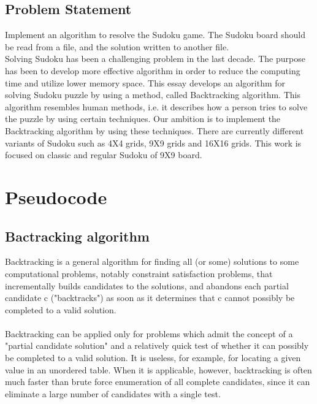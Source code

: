 \documentclass[12pt, letterpaper]{article}
\begin{document}
        \subsection{Problem Statement}
        Implement an algorithm to resolve the Sudoku game. The Sudoku board should be read from a file, and the solution written to another file. \\
        Solving Sudoku has been a challenging problem in the last decade. The purpose has been to
        develop more effective algorithm in order to reduce the computing time and utilize lower
        memory space. This essay develops an algorithm for solving Sudoku puzzle by using a
        method, called Backtracking algorithm. This algorithm resembles human methods, i.e. it
        describes how a person tries to solve the puzzle by using certain techniques. Our ambition is
        to implement the Backtracking algorithm by using these techniques.
        There are currently different variants of Sudoku such as 4X4 grids, 9X9 grids and 16X16
        grids. This work is focused on classic and regular Sudoku of 9X9 board. 
        \newpage
        
    \section{Pseudocode}
        \subsection{Bactracking algorithm}
        Backtracking is a general algorithm for finding all (or some) solutions to some computational problems, notably constraint satisfaction problems, that incrementally builds candidates to the solutions, and abandons each partial candidate c ("backtracks") as soon as it determines that c cannot possibly be completed to a valid solution. \\ \\
        Backtracking can be applied only for problems which admit the concept of a "partial candidate solution" and a relatively quick test of whether it can possibly be 		completed to a valid solution. It is useless, for example, for locating a given value in an unordered table. When it is applicable, however, backtracking is often much 		faster than brute force enumeration of all complete candidates, since it can eliminate a large number of candidates with a single test.
        
        \newpage
        
\end{document}
